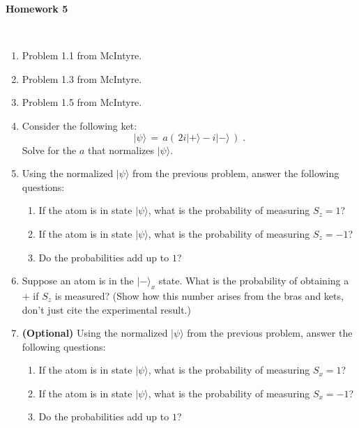 
\oddsidemargin=0in
\textwidth=6.75in

\renewcommand{\arraystretch}{1.3}


\pagestyle{empty}

\begin{center}
{\Large {\bf Homework 5}}
\end{center}
\hspace{1cm}\\

\begin{enumerate}

\item Problem 1.1 from McIntyre.

\item Problem 1.3 from McIntyre.

\item Problem 1.5 from McIntyre.


\item Consider the following ket:
\begin{equation}
  | \psi \rangle \, = \, a (\, 2i| + \rangle - i | - \rangle\,) \;.
\label{psi}
\end{equation}
Solve for the $a$ that normalizes $| \psi \rangle$. 

\item Using the normalized $| \psi \rangle$ from the previous problem,
answer the following questions:
\begin{enumerate}
   \item  If the atom is in state $| \psi \rangle$, what is the
    probability of measuring $S_z = 1$?
    \item If the atom is in state $| \psi \rangle$, what is the
    probability of measuring $S_z = -1$?
    \item Do the probabilities add up to $1$?
\end{enumerate}

\item Suppose an atom is in the $|-\rangle_x$ state.  What is the
probability of obtaining a $+$ if $S_z$ is measured?  (Show how this
number arises from the bras and kets, don't just cite the experimental
result.)

\item {\bf (Optional)}
Using the normalized $| \psi \rangle$ from the previous problem,
answer the following questions:
\begin{enumerate}
   \item  If the atom is in state $| \psi \rangle$, what is the
    probability of measuring $S_x = 1$?
    \item If the atom is in state $| \psi \rangle$, what is the
    probability of measuring $S_x = -1$?
    \item Do the probabilities add up to $1$?
\end{enumerate}


\end{enumerate}
